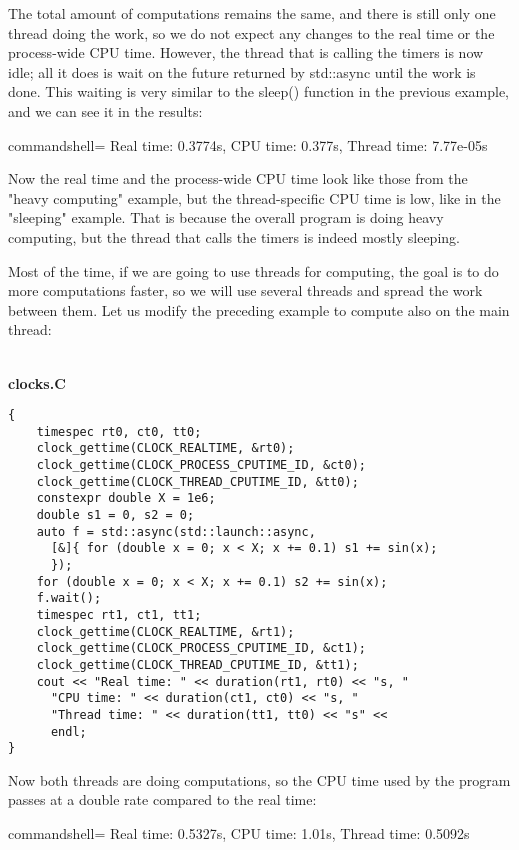 The total amount of computations remains the same, and there is still only one thread doing the work, so we do not expect any changes to the real time or the process-wide CPU time. However, the thread that is calling the timers is now idle; all it does is wait on the future returned by std::async until the work is done. This waiting is very similar to the sleep() function in the previous example, and we can see it in the results:

\begin{tcblisting}{commandshell={}}
Real time: 0.3774s, CPU time: 0.377s, Thread time: 7.77e-05s
\end{tcblisting}

Now the real time and the process-wide CPU time look like those from the "heavy computing" example, but the thread-specific CPU time is low, like in the "sleeping" example. That is because the overall program is doing heavy computing, but the thread that calls the timers is indeed mostly sleeping.

Most of the time, if we are going to use threads for computing, the goal is to do more computations faster, so we will use several threads and spread the work between them. Let us modify the preceding example to compute also on the main thread:

\hspace*{\fill} \\ %
\noindent
\textbf{clocks.C}
\begin{lstlisting}[style=styleCXX]
{
	timespec rt0, ct0, tt0;
	clock_gettime(CLOCK_REALTIME, &rt0);
	clock_gettime(CLOCK_PROCESS_CPUTIME_ID, &ct0);
	clock_gettime(CLOCK_THREAD_CPUTIME_ID, &tt0);
	constexpr double X = 1e6;
	double s1 = 0, s2 = 0;
	auto f = std::async(std::launch::async,
	  [&]{ for (double x = 0; x < X; x += 0.1) s1 += sin(x);
	  });
	for (double x = 0; x < X; x += 0.1) s2 += sin(x);
	f.wait();
	timespec rt1, ct1, tt1;
	clock_gettime(CLOCK_REALTIME, &rt1);
	clock_gettime(CLOCK_PROCESS_CPUTIME_ID, &ct1);
	clock_gettime(CLOCK_THREAD_CPUTIME_ID, &tt1);
	cout << "Real time: " << duration(rt1, rt0) << "s, "
	  "CPU time: " << duration(ct1, ct0) << "s, "
	  "Thread time: " << duration(tt1, tt0) << "s" <<
	  endl;
}
\end{lstlisting}

Now both threads are doing computations, so the CPU time used by the program passes at a double rate compared to the real time:

\begin{tcblisting}{commandshell={}}
Real time: 0.5327s, CPU time: 1.01s, Thread time: 0.5092s
\end{tcblisting}

